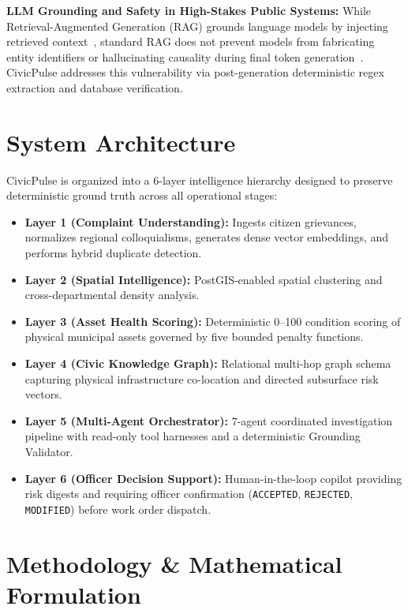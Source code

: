 \documentclass[conference]{IEEEtran}
\begin{document}
\textbf{LLM Grounding and Safety in High-Stakes Public Systems:} While Retrieval-Augmented Generation (RAG) grounds language models by injecting retrieved context~\cite{b4}, standard RAG does not prevent models from fabricating entity identifiers or hallucinating causality during final token generation~\cite{b6}. CivicPulse addresses this vulnerability via post-generation deterministic regex extraction and database verification.

\section{System Architecture}
CivicPulse is organized into a 6-layer intelligence hierarchy designed to preserve deterministic ground truth across all operational stages:
\begin{itemize}
    \item \textbf{Layer 1 (Complaint Understanding):} Ingests citizen grievances, normalizes regional colloquialisms, generates dense vector embeddings, and performs hybrid duplicate detection.
    \item \textbf{Layer 2 (Spatial Intelligence):} PostGIS-enabled spatial clustering and cross-departmental density analysis.
    \item \textbf{Layer 3 (Asset Health Scoring):} Deterministic 0--100 condition scoring of physical municipal assets governed by five bounded penalty functions.
    \item \textbf{Layer 4 (Civic Knowledge Graph):} Relational multi-hop graph schema capturing physical infrastructure co-location and directed subsurface risk vectors.
    \item \textbf{Layer 5 (Multi-Agent Orchestrator):} 7-agent coordinated investigation pipeline with read-only tool harnesses and a deterministic Grounding Validator.
    \item \textbf{Layer 6 (Officer Decision Support):} Human-in-the-loop copilot providing risk digests and requiring officer confirmation (\texttt{ACCEPTED}, \texttt{REJECTED}, \texttt{MODIFIED}) before work order dispatch.
\end{itemize}

\section{Methodology \& Mathematical Formulation}
\end{document}
